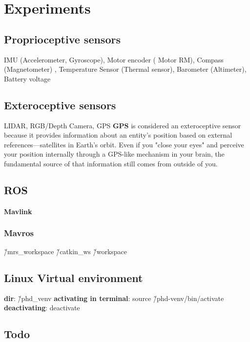 \chapter{Experiments}
    \section{Proprioceptive sensors} IMU (Accelerometer, Gyroscope), Motor encoder (	Motor RM), Compass (Magnetometer) , Temperature Sensor (Thermal sensor), Barometer (Altimeter), Battery voltage
    
    \section{Exteroceptive sensors} LIDAR, RGB/Depth Camera, GPS 
        \textbf{GPS} is considered an exteroceptive sensor because it provides information about an entity’s position based on external references—satellites in Earth's orbit. Even if you "close your eyes" and perceive your position internally through a GPS-like mechanism in your brain, the fundamental source of that information still comes from outside of you.

    \section{ROS}
        \subsubsection{Mavlink}
        \subsection{Mavros}
            \~/mrs_workspace
            \~/catkin_ws
            \~/workspace

    \section{Linux Virtual environment}
    \textbf{dir}: \~/phd_venv
    \textbf{activating in terminal}: source \~/phd-venv/bin/activate
    \textbf{deactivating}: deactivate


    \section{Todo}
